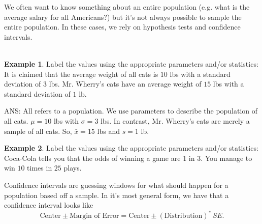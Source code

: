 \documentclass[12pt]{amsart}
\theoremstyle{definition}
\newtheorem{ex}{Example}
\begin{document}
 We often want to know something about an entire population (e.g. what is the average salary for all Americans?) but it's not always possible to sample the entire population. In these cases, we rely on hypothesis tests and confidence intervals.\\
 ~\\
 \begin{ex} Label the values using the appropriate parameters and/or statistics: It is claimed that the average weight of all cats is $10$ lbs with a standard deviation of $3$ lbs. Mr. Wherry's cats have an average weight of $15$ lbs with a standard deviation of $1$ lb.
 \end{ex}
\noindent ANS: All refers to a population. We use parameters to describe the population of all cats. $\mu=10$ lbs with $\sigma=3$ lbs. In contrast, Mr. Wherry's cats are merely a sample of all cats. So, $\bar{x}=15$ lbs and $s=1$ lb.

\begin{ex}  Label the values using the appropriate parameters and/or statistics: Coca-Cola tells you that the odds of winning a game are $1$ in $3$. You manage to win $10$ times in $25$ plays.
\end{ex}

\vspace{1in}

\newpage
\noindent Confidence intervals are guessing windows for what should happen for a population based off a sample. In it's most general form, we have that a confidence interval looks like $$\text{Center}\pm \text{Margin of Error}=\text{Center}\pm (\text{Distribution})^*\,SE.$$
\end{document}
